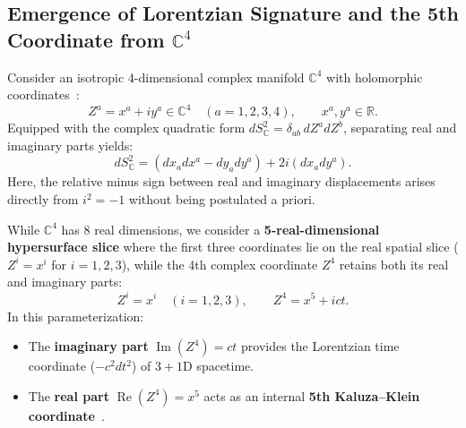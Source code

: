 \documentclass[11pt,a4paper]{article}
\begin{document}
\subsection{Emergence of Lorentzian Signature and the 5th Coordinate from \texorpdfstring{$\mathbb{C}^4$}{C4}}
Consider an isotropic 4-dimensional complex manifold $\mathbb{C}^4$ with holomorphic coordinates~\cite{PenroseRindler1984,Newman1976}:
\begin{equation}
Z^a = x^a + i y^a \in \mathbb{C}^4 \quad (a = 1, 2, 3, 4), \qquad x^a, y^a \in \mathbb{R}.
\end{equation}
Equipped with the complex quadratic form $dS_{\mathbb{C}}^2 = \delta_{ab}\, dZ^a dZ^b$, separating real and imaginary parts yields:
\begin{equation}
dS_{\mathbb{C}}^2 = \left( dx_a dx^a - dy_a dy^a \right) + 2i \left( dx_a dy^a \right).
\end{equation}
Here, the relative minus sign between real and imaginary displacements arises directly from $i^2 = -1$ without being postulated a priori.

While $\mathbb{C}^4$ has 8 real dimensions, we consider a \textbf{5-real-dimensional hypersurface slice} where the first three coordinates lie on the real spatial slice ($Z^i = x^i$ for $i=1,2,3$), while the 4th complex coordinate $Z^4$ retains both its real and imaginary parts:
\begin{equation}
Z^i = x^i \quad (i = 1,2,3), \qquad Z^4 = x^5 + i c t.
\end{equation}
In this parameterization:
\begin{itemize}
    \item The \textbf{imaginary part} $\operatorname{Im}(Z^4) = ct$ provides the Lorentzian time coordinate ($-c^2 dt^2$) of $3+1\text{D}$ spacetime.
    \item The \textbf{real part} $\operatorname{Re}(Z^4) = x^5$ acts as an internal \textbf{5th Kaluza--Klein coordinate}~\cite{Kaluza1921,Klein1926,Wesson1999}.
\end{itemize}
\end{document}
